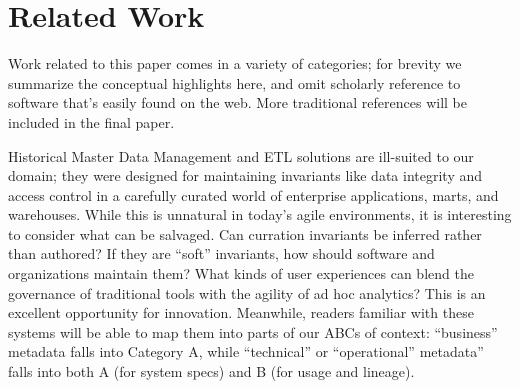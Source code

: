 \documentclass{sig-alternate}
\begin{document}




\section{Related Work}
\label{sec:relwork}
Work related to this paper comes in a variety of categories; for brevity we summarize the conceptual highlights here, and omit scholarly reference to software that's easily found on the web. 
More traditional references will be included in the final paper. 

Historical Master Data Management and ETL solutions are ill-suited to our domain; they were designed for maintaining invariants like data integrity and access control in a carefully curated world of enterprise applications, marts, and warehouses. 
While this is unnatural in today's agile environments, it is interesting to consider what can be salvaged. 
Can curration invariants be inferred rather than authored? 
If they are ``soft'' invariants, how should software and organizations maintain them? 
What kinds of user experiences can blend the governance of traditional tools with the agility of ad hoc analytics?  
This is an excellent opportunity for innovation. 
Meanwhile, readers familiar with these systems will be able to map them into parts of our ABCs of context: ``business'' metadata falls into Category A, while ``technical'' or ``operational'' metadata'' falls into both A (for system specs) and B (for usage and lineage).
\end{document}
